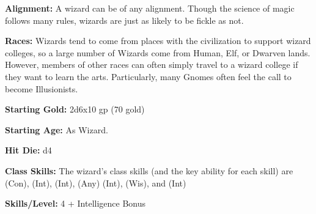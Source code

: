
\textbf{Alignment:} A wizard can be of any alignment. Though the science of magic follows many rules, wizards are just as likely to be fickle as not.

\textbf{Races:} Wizards tend to come from places with the civilization to support wizard colleges, so a large number of Wizards come from Human, Elf, or Dwarven lands. However, members of other races can often simply travel to a wizard college if they want to learn the arts. Particularly, many Gnomes often feel the call to become Illusionists.

\textbf{Starting Gold:} 2d6x10 gp (70 gold)

\textbf{Starting Age:} As Wizard.

\textbf{Hit Die:} d4

\textbf{Class Skills:} The wizard's class skills (and the key ability for each skill) are  (Con),  (Int),  (Int),  (Any) (Int),  (Wis), and  (Int)

\textbf{Skills/Level:} 4 + Intelligence Bonus

\poorbab{}
\poorfor{}
\poorref{}
\goodwil{}

\begin{fullcastingclasstable}
\end{fullcastingclasstable}

